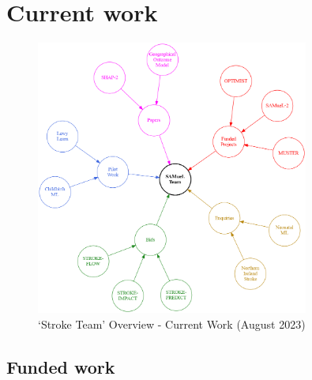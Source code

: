 
\section{Current work}

\begin{figure}[!th]
    \centering
    \includegraphics[width=0.8\textwidth]{./images/work}
    \caption{`Stroke Team' Overview - Current Work (August 2023)}
  \label{fig:shap_multiple_regression}
\end{figure}

\subsection{Funded work}

